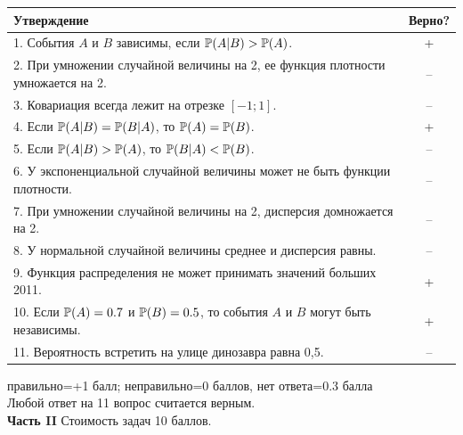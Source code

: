 \documentclass[12pt, a4paper]{article}\usepackage[]{graphicx}\usepackage[]{color}
\begin{document}
		\renewcommand\arraystretch{2.0}

		\begin{tabular}{|p{15cm}|c|}
			\hline
			Утверждение & Верно? \\
			\hline
			1. События $A$ и $B$ зависимы, если $\P(A|B)>\P(A)$.  &  + \\
			\hline
			2. При умножении случайной величины на 2, ее функция плотности умножается на 2. & -- \\
			\hline
			3. Ковариация всегда лежит на отрезке $[-1;1]$. &  -- \\
			\hline
			4. Если $\P(A|B)=\P(B|A)$, то $\P(A)=\P(B)$. & + \\
			\hline
			5. Если $\P(A|B)>\P(A)$, то $\P(B|A)<\P(B)$. & -- \\
			\hline
			6. У экспоненциальной случайной величины может не быть функции плотности. &  -- \\
			\hline
			7. При умножении случайной величины на 2, дисперсия домножается на 2. & -- \\
			\hline
			8. У нормальной случайной величины среднее и дисперсия равны. &  -- \\
			\hline
			9. Функция распределения не может принимать значений больших 2011. & + \\
			\hline
			10. Если $\P(A)=0.7$ и $\P(B)=0.5$, то события $A$ и $B$ могут быть независимы. & + \\
			\hline
			11. Вероятность встретить на улице динозавра равна 0{,}5. & -- \\
			\hline
		\end{tabular}

		правильно=+1 балл; неправильно=0 баллов, нет ответа=0.3 балла \\
		Любой ответ на 11 вопрос считается верным. \\

		\textbf{Часть II} Стоимость задач 10 баллов. \\
\end{document}

